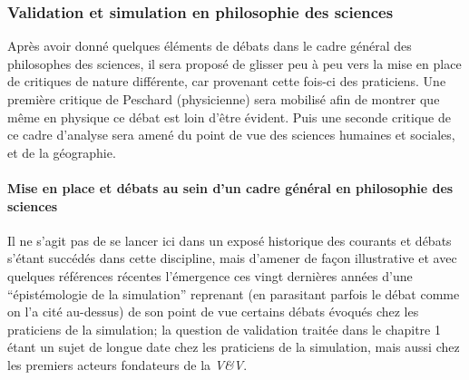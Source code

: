 \subsubsection{Validation et simulation en philosophie des sciences}
\label{sssec:philo_sciences}


Après avoir donné quelques éléments de débats dans le cadre général des philosophes des sciences, il sera proposé de glisser peu à peu vers la mise en place de critiques de nature différente, car provenant cette fois-ci des praticiens. Une première critique de Peschard (physicienne) \autocite{Peschard2013} sera mobilisé afin de montrer que même en physique ce débat est loin d'être évident. Puis une seconde critique de ce cadre d'analyse sera amené du point de vue des sciences humaines et sociales, et de la géographie.

\paragraph{Mise en place et débats au sein d'un cadre général en philosophie des sciences}


Il ne s'agit pas de se lancer ici dans un exposé historique des courants et débats s'étant succédés dans cette discipline, mais d'amener de façon illustrative et avec quelques références récentes l'émergence ces vingt dernières années d'une \enquote{épistémologie de la simulation} reprenant (en parasitant parfois le débat comme on l'a cité au-dessus) de son point de vue certains débats évoqués chez les praticiens de la simulation; la question de validation traitée dans le chapitre 1 étant un sujet de longue date chez les praticiens de la simulation, mais aussi chez les premiers acteurs fondateurs de la \textit{V\&V}.

